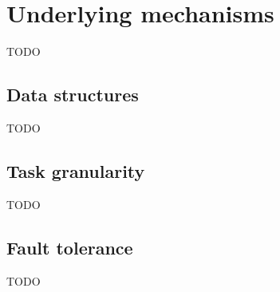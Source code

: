 \section{Underlying mechanisms}
TODO

\subsection{Data structures}
TODO

\subsection{Task granularity}
TODO

\subsection{Fault tolerance}
TODO